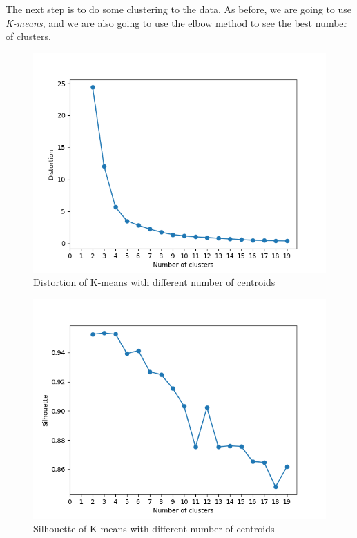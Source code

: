 \documentclass[idxtotoc,hyperref,openany]{labbook} %
\begin{document}
The next step is to do some clustering to the data. As before, we are going to use \textit{K-means}, and we are also going to use the elbow method to see the best number of clusters.


\begin{figure}[h]
\includegraphics[width=0.9\linewidth]{KMeans_Distortion_Accelerometer_Day2_Selected.png}
\setlength\belowcaptionskip{-10pt}
\caption{Distortion of K-means with different number of centroids}
\label{K-means distortion 2 Selected}
\end{figure}

\begin{figure}[h]
\includegraphics[width=0.9\linewidth]{KMeans_Silhouette_Accelerometer_Day2_Selected.png}
\setlength\belowcaptionskip{-10pt}
\caption{Silhouette of K-means with different number of centroids}
\label{K-means silhouette 2 Selected}
\end{figure}
\end{document}
